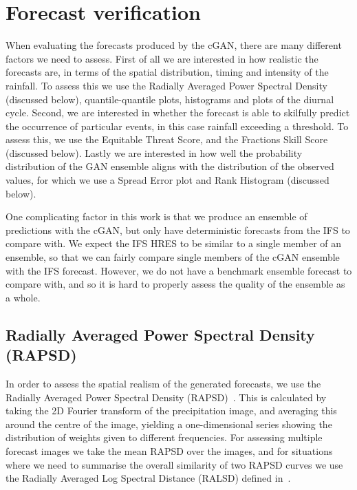 \documentclass[../main.tex]{subfiles}
\begin{document}
\section{Forecast verification}
\label{sec:fcast_verif}
When evaluating the forecasts produced by the cGAN, there are many different factors we need to assess. First of all we are interested in how realistic the forecasts are, in terms of the spatial distribution, timing and intensity of the rainfall. To assess this we use the Radially Averaged Power Spectral Density (discussed below), quantile-quantile plots, histograms and plots of the diurnal cycle. Second, we are interested in whether the forecast is able to skilfully predict the occurrence of particular events, in this case rainfall exceeding a threshold. To assess this, we use the Equitable Threat Score, and the Fractions Skill Score (discussed below). Lastly we are interested in how well the probability distribution of the GAN ensemble aligns with the distribution of the observed values, for which we use a Spread Error plot and Rank Histogram (discussed below).

One complicating factor in this work is that we produce an ensemble of predictions with the cGAN, but only have deterministic forecasts from the IFS to compare with. We expect the IFS HRES to be similar to a single member of an ensemble, so that we can fairly compare single members of the cGAN ensemble with the IFS forecast. However, we do not have a benchmark ensemble forecast to compare with, and so it is hard to properly assess the quality of the ensemble as a whole.


\subsection{Radially Averaged Power Spectral Density (RAPSD)}
\label{metrics:rapsd}

In order to assess the spatial realism of the generated forecasts, we use the Radially Averaged Power Spectral Density (RAPSD)~\citep{sinclair_empirical_2005, harris_multiscale_2001}. This is calculated by taking the 2D Fourier transform of the precipitation image, and averaging this around the centre of the image, yielding a one-dimensional series showing the distribution of weights given to different frequencies. For assessing multiple forecast images we take the mean RAPSD over the images, and for situations where we need to summarise the overall similarity of two RAPSD curves we use the Radially Averaged Log Spectral Distance (RALSD) defined in~\cite{harris_generative_2022}.
\end{document}
